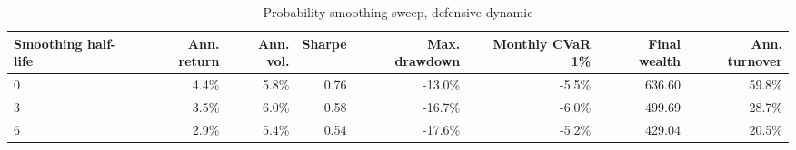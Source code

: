 \begin{table}[!htbp]
\centering
\caption{Probability-smoothing sweep, defensive dynamic}
\label{tab:allocation-smoothing-defensive}
\small
\setlength{\tabcolsep}{5pt}
\renewcommand{\arraystretch}{1.12}
\begin{adjustbox}{center,max width=\linewidth}
\begin{tabular}{lrrrrrrr}
\toprule
Smoothing half-life & Ann. return & Ann. vol. & Sharpe & Max. drawdown & Monthly CVaR 1\% & Final wealth & Ann. turnover \\
\midrule
0 & 4.4\% & 5.8\% & 0.76 & -13.0\% & -5.5\% & 636.60 & 59.8\% \\
3 & 3.5\% & 6.0\% & 0.58 & -16.7\% & -6.0\% & 499.69 & 28.7\% \\
6 & 2.9\% & 5.4\% & 0.54 & -17.6\% & -5.2\% & 429.04 & 20.5\% \\
\bottomrule
\end{tabular}
\end{adjustbox}
\end{table}